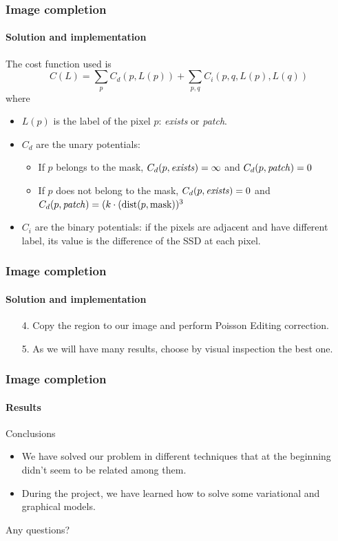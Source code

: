 \documentclass[11pt]{beamer}
\begin{document}
\begin{frame}
\frametitle{Image completion}
\framesubtitle{Solution and implementation}
The cost function used is
\begin{equation*}
C(L) = \sum_pC_d(p, L(p)) + \sum_{p, q}C_i(p, q, L(p), L(q))
\end{equation*}
where 
\begin{itemize}
\item $L(p)$ is the label of the pixel $p$: \emph{exists} or \emph{patch}.
\item $C_d$ are the unary potentials:
\begin{itemize}
\item If $p$ belongs to the mask, $C_d(p, \text{\emph{exists}}) = \infty$ and $C_d(p, \text{\emph{patch}}) = 0$
\item If $p$ does not belong to the mask, $C_d(p, \text{\emph{exists}}) = 0$ and $C_d(p, \text{\emph{patch}}) = (k\cdot(\text{dist}(p, \text{mask}))^3$
\end{itemize}


\item $C_i$ are the binary potentials: if the pixels are adjacent and have different label, its value is the difference of the SSD at each pixel.
\end{itemize}
\end{frame}

\begin{frame}
\frametitle{Image completion}
\framesubtitle{Solution and implementation}
\begin{itemize}
\item [4.] Copy the region to our image and perform Poisson Editing correction.
\item [5.] As we will have many results, choose by visual inspection the best one.
\end{itemize}
\end{frame}

\begin{frame}
\frametitle{Image completion}
\framesubtitle{Results}

\end{frame}


\begin{frame}{Conclusions}
\begin{itemize}
\item We have solved our problem in different techniques that at the beginning didn't seem to be related among them.
\item During the project, we have learned how to solve some variational and graphical models.

\end{itemize}
\end{frame}

\begin{frame}
\begin{block}{}
\centering
\Large Any questions?
\end{block}
\end{frame}
\end{document}

